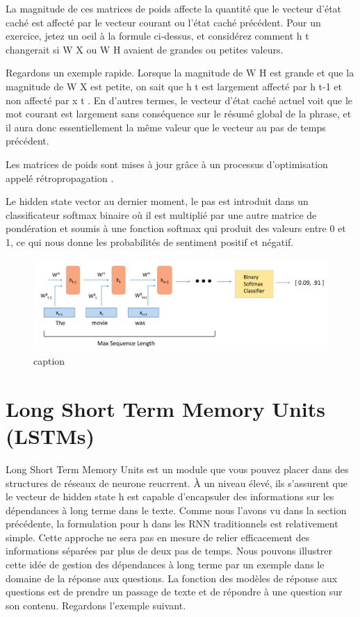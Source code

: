 \documentclass[11pt]{article}
\makeatletter
\def\maxwidth{\ifdim\Gin@nat@width>\linewidth\linewidth
    \else\Gin@nat@width\fi}
\let\Oldincludegraphics\includegraphics
\renewcommand{\includegraphics}[1]{\Oldincludegraphics[width=.8\maxwidth]{#1}}
\makeatother
\begin{document}
La magnitude de ces matrices de poids affecte la quantité que le vecteur
d'état caché est affecté par le vecteur courant ou l'état caché
précédent. Pour un exercice, jetez un oeil à la formule ci-dessus, et
considérez comment h t changerait si W X ou W H avaient de grandes ou
petites valeurs.

Regardons un exemple rapide. Lorsque la magnitude de W H est grande et
que la magnitude de W X est petite, on sait que h t est largement
affecté par h t-1 et non affecté par x t . En d'autres termes, le
vecteur d'état caché actuel voit que le mot courant est largement sans
conséquence sur le résumé global de la phrase, et il aura donc
essentiellement la même valeur que le vecteur au pas de temps précédent.

Les matrices de poids sont mises à jour grâce à un processus
d'optimisation appelé rétropropagation .

Le hidden state vector au dernier moment, le pas est introduit dans un
classificateur softmax binaire où il est multiplié par une autre matrice
de pondération et soumis à une fonction softmax qui produit des valeurs
entre 0 et 1, ce qui nous donne les probabilités de sentiment positif et
négatif.

\begin{figure}
\centering
\includegraphics{Images/SentimentAnalysis16.png}
\caption{caption}
\end{figure}

    \section{Long Short Term Memory Units
(LSTMs)}\label{long-short-term-memory-units-lstms}

    Long Short Term Memory Units est un module que vous pouvez placer dans
des structures de réseaux de neurone reucrrent. À un niveau élevé, ils
s'assurent que le vecteur de hidden state h est capable d'encapsuler des
informations sur les dépendances à long terme dans le texte. Comme nous
l'avons vu dans la section précédente, la formulation pour h dans les
RNN traditionnels est relativement simple. Cette approche ne sera pas en
mesure de relier efficacement des informations séparées par plus de deux
pas de temps. Nous pouvons illustrer cette idée de gestion des
dépendances à long terme par un exemple dans le domaine de la réponse
aux questions. La fonction des modèles de réponse aux questions est de
prendre un passage de texte et de répondre à une question sur son
contenu. Regardons l'exemple suivant.
\end{document}
